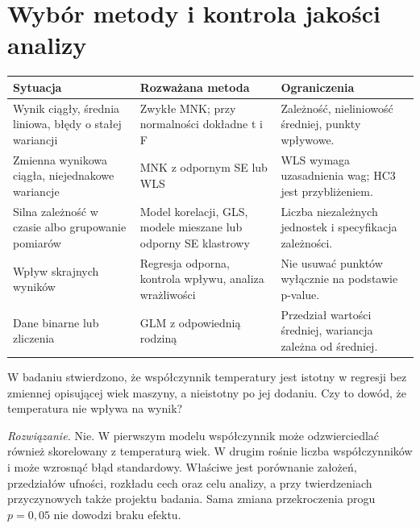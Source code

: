 \section{Wybór metody i kontrola jakości analizy}
\begin{center}\small
\begin{tabular}{>{\raggedright\arraybackslash}p{}>{\raggedright\arraybackslash}p{}>{\raggedright\arraybackslash}p{}}
\toprule
\textbf{Sytuacja} & \textbf{Rozważana metoda} & \textbf{Ograniczenia}\\
\midrule
Wynik ciągły, średnia liniowa, błędy o stałej wariancji & Zwykłe MNK; przy normalności dokładne t i F & Zależność, nieliniowość średniej, punkty wpływowe.\\
Zmienna wynikowa ciągła, niejednakowe wariancje & MNK z odpornym SE lub WLS & WLS wymaga uzasadnienia wag; HC3 jest przybliżeniem.\\
Silna zależność w czasie albo grupowanie pomiarów & Model korelacji, GLS, modele mieszane lub odporny SE klastrowy & Liczba niezależnych jednostek i specyfikacja zależności.\\
Wpływ skrajnych wyników & Regresja odporna, kontrola wpływu, analiza wrażliwości & Nie usuwać punktów wyłącznie na podstawie p-value.\\
Dane binarne lub zliczenia & GLM z odpowiednią rodziną & Przedział wartości średniej, wariancja zależna od średniej.\\
\bottomrule
\end{tabular}
\end{center}

\begin{zadanie}
W badaniu stwierdzono, że współczynnik temperatury jest
istotny w regresji bez zmiennej opisującej wiek maszyny,
a nieistotny po jej dodaniu. Czy to dowód, że temperatura
nie wpływa na wynik?
\par\emph{Rozwiązanie.} Nie. W pierwszym modelu współczynnik
może odzwierciedlać również skorelowany z temperaturą wiek.
W drugim rośnie liczba współczynników i może wzrosnąć
błąd standardowy. Właściwe jest porównanie założeń,
przedziałów ufności, rozkładu cech oraz celu analizy,
a przy twierdzeniach przyczynowych także projektu badania.
Sama zmiana przekroczenia progu $p=0{,}05$ nie dowodzi
braku efektu.
\end{zadanie}

